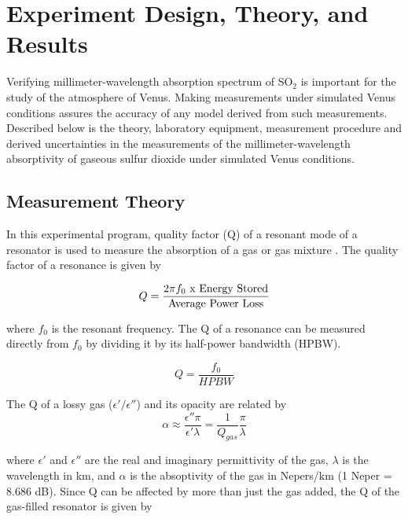 \chapter{Experiment Design, Theory, and Results}

Verifying millimeter-wavelength absorption spectrum of SO$_2$ is important for the study of the atmosphere of Venus. Making measurements under simulated Venus conditions assures the accuracy of any model derived from such measurements.
 Described below is the theory, laboratory equipment, measurement procedure and derived uncertainties in the measurements of the millimeter-wavelength absorptivity of gaseous sulfur dioxide under simulated Venus conditions.

\section{Measurement Theory}

In this experimental program, quality factor (Q) of a resonant mode of a resonator is used to measure the absorption of a gas or gas mixture \cite{high-sensitivity}. The quality factor of a resonance is given by \cite{matching}

\begin{equation} \label{eq:qlong}
Q = \frac{2\pi f_0 \textnormal{ x Energy Stored}}{\textnormal{Average Power Loss}}
\end{equation}

\noindent where $f_0$ is the resonant frequency. The Q of a resonance can be measured directly from $f_0$ by dividing it by its half-power bandwidth (HPBW).

\begin{equation} \label{eq:qshort}
Q = \frac{f_0}{HPBW}
\end{equation}

\noindent The Q of a lossy gas ($\epsilon'/\epsilon''$) and its opacity are related by
\begin{equation} \label{eq:alphaapprox}
\alpha \approx \frac{\epsilon'' \pi}{\epsilon' \lambda} = \frac{1}{Q_{gas}} \frac{\pi}{\lambda}
\end{equation}

\noindent where $\epsilon'$ and $\epsilon''$ are the real and imaginary permittivity of the gas, $\lambda$ is the wavelength in km, and $\alpha$ is the absoptivity of the gas in Nepers/km (1 Neper = 8.686 dB). Since Q can be affected by more than just the gas added, the Q of the gas-filled resonator is given by

